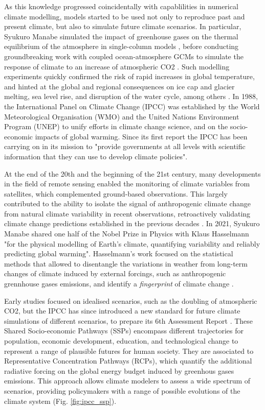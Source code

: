 As this knowledge progressed coincidentally with capablilities in numerical climate modelling, models started to be used not only to reproduce past and present climate, but also to simulate future climate scenarios. 
In particular, Syukuro Manabe simulated the impact of greenhouse gases on the thermal equilibrium of the atmosphere in single-column models \citep{manabe_thermal_1964}, before conducting groundbreaking work with coupled ocean-atmosphere GCMs to simulate the response of climate to an increase of atmospheric CO2 \citep{manabe_sensitivity_1980}. 
Such modelling experiments quickly confirmed the risk of rapid increases in global temperature, and hinted at the global and regional consequences on ice cap and glacier melting, sea level rise, and disruption of the water cycle, among others \citep{hansen_global_1988}. 
In 1988, the International Panel on Climate Change (IPCC) was established by the World Meteorological Organisation (WMO) and the United Nations Environment Program (UNEP) to unify efforts in climate change science, and on the socio-economic impacts of global warming. Since its first report \citep{IPCC_1990_AR1_WG1} the IPCC has been carrying on in its mission to "provide governments at all levels with scientific information that they can use to develop climate policies".

At the end of the 20th and the beginning of the 21st century, many developments in the field of remote sensing enabled the monitoring of climate variables from satellites, which complemented ground-based observations. This largely contributed to the ability to isolate the signal of anthropogenic climate change from natural climate variability in recent observations, retroactively validating climate change predictions established in the previous decades \citep{hansen_earths_2005,yang_role_2013}. 
In 2021, Syukuro Manabe shared one half of the Nobel Prize in Physics with Klaus Hasselmann "for the physical modelling of Earth's climate, quantifying variability and reliably predicting global warming". 
Hasselmann's work focused on the statistical methods that allowed to disentangle the variations in weather from long-term changes of climate induced by external forcings, such as anthropogenic grennhouse gases emissions, and identify a \textit{fingerprint} of climate change \citep{hasselmann_optimal_1993,hasselmann_stochastic_2022}.

Early studies focused on idealised scenarios, such as the doubling of atmospheric CO2, but the IPCC has since introduced a new standard for future climate simulations of different scenarios, to prepare its 6th Assessment Report \citep{RN1}. These Shared Socio-economic Pathways (SSPs) encompass different trajectories for population, economic development, education, and technological change to represent a range of plausible futures for human society. They are associated to Representative Concentration Pathways (RCPs), which quantify the additional radiative forcing on the global energy budget induced by greenhous gases emissions.
This approach allows climate modelers to assess a wide spectrum of scenarios, providing policymakers with a range of possible evolutions of the climate system (Fig. \ref{fig:ipcc_ssp}).

